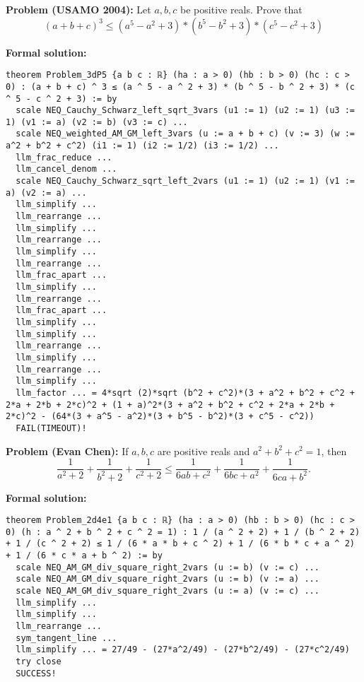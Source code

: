 \begin{tcolorbox}[enhanced, colback=black!5!white, colframe=black!75!white, title=A Failed Case of \name]

\textbf{Problem (USAMO 2004):} 
Let $a, b, c$ be positive reals. Prove that
\begin{equation*}
(a + b + c) ^ 3 \leq (a ^ 5 - a ^ 2 + 3) * (b ^ 5 - b ^ 2 + 3) * (c ^ 5 - c ^ 2 + 3)
\end{equation*}
\tcbline


\textbf{Formal solution:}
\begin{lstlisting}
theorem Problem_3dP5 {a b c : ℝ} (ha : a > 0) (hb : b > 0) (hc : c > 0) : (a + b + c) ^ 3 ≤ (a ^ 5 - a ^ 2 + 3) * (b ^ 5 - b ^ 2 + 3) * (c ^ 5 - c ^ 2 + 3) := by 
  scale NEQ_Cauchy_Schwarz_left_sqrt_3vars (u1 := 1) (u2 := 1) (u3 := 1) (v1 := a) (v2 := b) (v3 := c) ...
  scale NEQ_weighted_AM_GM_left_3vars (u := a + b + c) (v := 3) (w := a^2 + b^2 + c^2) (i1 := 1) (i2 := 1/2) (i3 := 1/2) ...
  llm_frac_reduce ...
  llm_cancel_denom ...
  scale NEQ_Cauchy_Schwarz_sqrt_left_2vars (u1 := 1) (u2 := 1) (v1 := a) (v2 := a) ...
  llm_simplify ...
  llm_rearrange ...
  llm_simplify ...
  llm_rearrange ...
  llm_simplify ...
  llm_rearrange ...
  llm_frac_apart ...
  llm_simplify ...
  llm_rearrange ...
  llm_frac_apart ...
  llm_simplify ...
  llm_simplify ...
  llm_rearrange ...
  llm_simplify ...
  llm_rearrange ...
  llm_simplify ...
  llm_factor ... = 4*sqrt (2)*sqrt (b^2 + c^2)*(3 + a^2 + b^2 + c^2 + 2*a + 2*b + 2*c)^2 + (1 + a)^2*(3 + a^2 + b^2 + c^2 + 2*a + 2*b + 2*c)^2 - (64*(3 + a^5 - a^2)*(3 + b^5 - b^2)*(3 + c^5 - c^2))
  FAIL(TIMEOUT)! 
\end{lstlisting}

\end{tcolorbox}

\begin{tcolorbox}[enhanced, colback=black!5!white, colframe=black!75!white, title=A Successful Case of \name]

\textbf{Problem (Evan Chen):} 
If $a, b, c$ are positive reals and $a ^ 2 + b ^ 2 + c ^ 2 = 1$, then
\begin{equation*}
\frac{1}{a^2+2}+\frac{1}{b^2+2}+\frac{1}{c^2+2} \leq \frac{1}{6 a b+c^2}+\frac{1}{6 b c+a^2}+\frac{1}{6 c a+b^2}.
\end{equation*}
\tcbline


\textbf{Formal solution:}
\begin{lstlisting}
theorem Problem_2d4e1 {a b c : ℝ} (ha : a > 0) (hb : b > 0) (hc : c > 0) (h : a ^ 2 + b ^ 2 + c ^ 2 = 1) : 1 / (a ^ 2 + 2) + 1 / (b ^ 2 + 2) + 1 / (c ^ 2 + 2) ≤ 1 / (6 * a * b + c ^ 2) + 1 / (6 * b * c + a ^ 2) + 1 / (6 * c * a + b ^ 2) := by
  scale NEQ_AM_GM_div_square_right_2vars (u := b) (v := c) ...
  scale NEQ_AM_GM_div_square_right_2vars (u := b) (v := a) ...
  scale NEQ_AM_GM_div_square_right_2vars (u := a) (v := c) ...
  llm_simplify ...
  llm_simplify ...
  llm_rearrange ...
  sym_tangent_line ...
  llm_simplify ... = 27/49 - (27*a^2/49) - (27*b^2/49) - (27*c^2/49)
  try close
  SUCCESS!
\end{lstlisting}
\end{tcolorbox}


